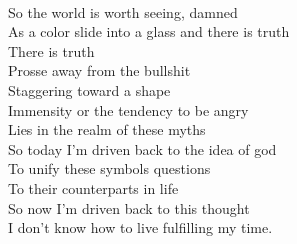 \documentclass[smalldemyvopaper,11pt,twoside,onecolumn,openright,extrafontsizes]{memoir}
\begin{document}
\\So the world is worth seeing, damned
\\As a color slide into a glass and there is truth
\\There is truth
\\Prosse away from the bullshit
\\Staggering toward a shape
\\Immensity or the tendency to be angry
\\Lies in the realm of these myths
\\So today I'm driven back to the idea of god
\\To unify these symbols questions
\\To their counterparts in life
\\So now I'm driven back to this thought
\\I don't know how to live fulfilling my time.
\end{document}
